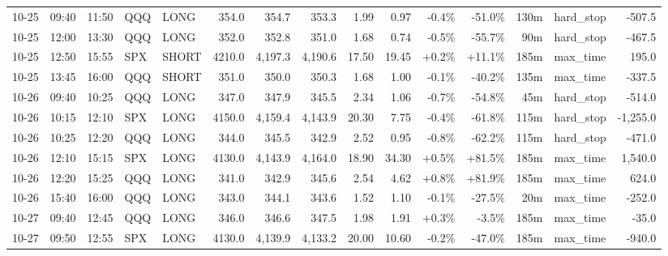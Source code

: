 \documentclass[11pt,a4paper,twoside]{article}
\begin{document}
\begin{landscape}
\begin{center}
\begin{longtable}{>{\color{txtmain}}l l l l l r r r r r r r r >{\color{txtmain}}l r}
10-25 & 09:40 & 11:50 & QQQ & LONG & 354.0 & 354.7 & 353.3 & 1.99 & 0.97 & \textcolor{lossred}{-0.4\%} & \textcolor{lossred}{-51.0\%} & 130m & hard\_stop & \textcolor{lossred}{-507.5} \\
10-25 & 12:00 & 13:30 & QQQ & LONG & 352.0 & 352.8 & 351.0 & 1.68 & 0.74 & \textcolor{lossred}{-0.5\%} & \textcolor{lossred}{-55.7\%} & 90m & hard\_stop & \textcolor{lossred}{-467.5} \\
10-25 & 12:50 & 15:55 & SPX & SHORT & 4210.0 & 4,197.3 & 4,190.6 & 17.50 & 19.45 & \textcolor{wingreen}{+0.2\%} & \textcolor{wingreen}{+11.1\%} & 185m & max\_time & \textcolor{wingreen}{195.0} \\
10-25 & 13:45 & 16:00 & QQQ & SHORT & 351.0 & 350.0 & 350.3 & 1.68 & 1.00 & \textcolor{lossred}{-0.1\%} & \textcolor{lossred}{-40.2\%} & 135m & max\_time & \textcolor{lossred}{-337.5} \\
10-26 & 09:40 & 10:25 & QQQ & LONG & 347.0 & 347.9 & 345.5 & 2.34 & 1.06 & \textcolor{lossred}{-0.7\%} & \textcolor{lossred}{-54.8\%} & 45m & hard\_stop & \textcolor{lossred}{-514.0} \\
10-26 & 10:15 & 12:10 & SPX & LONG & 4150.0 & 4,159.4 & 4,143.9 & 20.30 & 7.75 & \textcolor{lossred}{-0.4\%} & \textcolor{lossred}{-61.8\%} & 115m & hard\_stop & \textcolor{lossred}{-1,255.0} \\
10-26 & 10:25 & 12:20 & QQQ & LONG & 344.0 & 345.5 & 342.9 & 2.52 & 0.95 & \textcolor{lossred}{-0.8\%} & \textcolor{lossred}{-62.2\%} & 115m & hard\_stop & \textcolor{lossred}{-471.0} \\
10-26 & 12:10 & 15:15 & SPX & LONG & 4130.0 & 4,143.9 & 4,164.0 & 18.90 & 34.30 & \textcolor{wingreen}{+0.5\%} & \textcolor{wingreen}{+81.5\%} & 185m & max\_time & \textcolor{wingreen}{1,540.0} \\
10-26 & 12:20 & 15:25 & QQQ & LONG & 341.0 & 342.9 & 345.6 & 2.54 & 4.62 & \textcolor{wingreen}{+0.8\%} & \textcolor{wingreen}{+81.9\%} & 185m & max\_time & \textcolor{wingreen}{624.0} \\
10-26 & 15:40 & 16:00 & QQQ & LONG & 343.0 & 344.1 & 343.6 & 1.52 & 1.10 & \textcolor{lossred}{-0.1\%} & \textcolor{lossred}{-27.5\%} & 20m & max\_time & \textcolor{lossred}{-252.0} \\
10-27 & 09:40 & 12:45 & QQQ & LONG & 346.0 & 346.6 & 347.5 & 1.98 & 1.91 & \textcolor{wingreen}{+0.3\%} & \textcolor{lossred}{-3.5\%} & 185m & max\_time & \textcolor{lossred}{-35.0} \\
10-27 & 09:50 & 12:55 & SPX & LONG & 4130.0 & 4,139.9 & 4,133.2 & 20.00 & 10.60 & \textcolor{lossred}{-0.2\%} & \textcolor{lossred}{-47.0\%} & 185m & max\_time & \textcolor{lossred}{-940.0} \\

\end{longtable}
\end{center}
\end{landscape}
\end{document}
